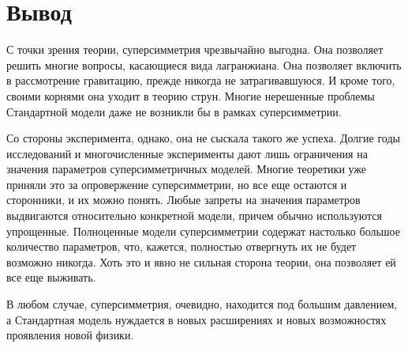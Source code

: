 \documentclass[a4paper, 10pt, twocolumn]{article}
\begin{document}

\section{Вывод}

С точки зрения теории, суперсимметрия чрезвычайно выгодна. Она 
позволяет решить многие вопросы, касающиеся вида лагранжиана. Она 
позволяет включить в рассмотрение гравитацию, прежде никогда не 
затрагивавшуюся. И кроме того, своими корнями она уходит в теорию 
струн. Многие нерешенные проблемы Стандартной модели даже не возникли 
бы в рамках суперсимметрии.

Со стороны эксперимента, однако, она не сыскала такого же успеха. 
Долгие годы исследований и многочисленные эксперименты дают лишь 
ограничения на значения параметров суперсимметричных моделей. Многие 
теоретики уже приняли это за опровержение суперсимметрии, но все еще 
остаются и сторонники, и их можно понять. Любые запреты на значения 
параметров выдвигаются относительно конкретной модели, причем обычно 
используются упрощенные. Полноценные модели суперсимметрии содержат 
настолько большое количество параметров, что, кажется, полностью 
отвергнуть их не будет возможно никогда. Хоть это и явно не сильная 
сторона теории, она позволяет ей все еще выживать.

В любом случае, суперсимметрия, очевидно, находится под большим 
давлением, а Стандартная модель нуждается в новых расширениях и новых 
возможностях проявления новой физики.


\newpage


\end{document}
